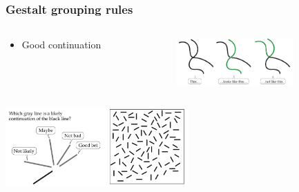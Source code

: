 \documentclass[]{beamer}
\begin{document}
\begin{frame}
\frametitle{Gestalt grouping rules}
\begin{overlayarea}{110mm}{70mm}
\begin{columns}[T]
\begin{column}{50mm}
\begin{center}
 \begin{itemize}
\setlength{\itemsep}{50pt}
 \item Good continuation
\end{itemize}
\end{center}
\end{column}

 \begin{column}{50mm}
\begin{center}
\includegraphics[width=45mm]{figs/l5/good_continuation.png}
\end{center}
 \end{column}
\end{columns}
\begin{center}
\includegraphics[width=70mm]{figs/l5/contour_completion_field.png}
\end{center}

\end{overlayarea}
\end{frame}
\end{document}
